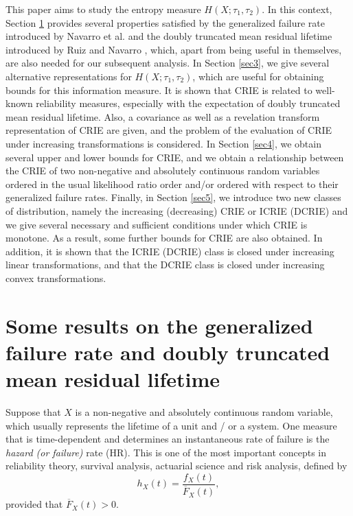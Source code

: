 \documentclass[11pt]{article}
\begin{document}
This paper aims to study the entropy measure $H(X; \tau_1, \tau_2)$. In this context, Section \ref{sec2} provides several properties satisfied by the generalized failure rate introduced by Navarro et al. \cite{Navarro1996} and the doubly truncated mean residual lifetime introduced by Ruiz and Navarro \cite{Ruiz1996}, which, apart from being useful in themselves, are also needed for our subsequent analysis. In Section \ref{sec3}, we give several alternative representations for $H(X; \tau_1, \tau_2)$, which are useful for obtaining bounds for this information measure. It is shown that CRIE is related to well-known reliability measures, especially with the expectation of doubly truncated mean residual lifetime. Also, a covariance as well as a revelation transform representation of CRIE are given, and the problem of the evaluation of CRIE under increasing transformations is considered. In Section \ref{sec4}, we obtain several upper and lower bounds for CRIE, and we obtain a relationship between the CRIE of two non-negative and absolutely continuous random variables ordered in the usual likelihood ratio order and/or ordered with respect to their generalized failure rates. Finally, in Section \ref{sec5}, we introduce two new classes of distribution, namely the increasing (decreasing) CRIE or ICRIE (DCRIE) and we give several necessary and sufficient conditions under which CRIE is monotone. As a result, some further bounds for CRIE are also obtained. In addition, it is shown that the ICRIE (DCRIE) class is closed under increasing linear transformations, and that the DCRIE class is closed under increasing convex transformations.

\section{Some results on the generalized failure rate and doubly truncated mean residual lifetime} \label{sec2}

Suppose that $X$ is a non-negative and absolutely continuous random variable, which usually represents the lifetime of a unit and / or a system. One measure that is time-dependent and determines an instantaneous rate of failure is the \textit{hazard (or failure)} rate (HR). This is one of the most important concepts in reliability theory, survival analysis, actuarial science and risk analysis, defined by 
\begin{equation*}
\textstyle	h_X(t) = \frac{f_X(t)}{\overline{F}_X(t)},
\end{equation*}
provided that $\overline{F}_X(t) > 0$.  
\end{document}
